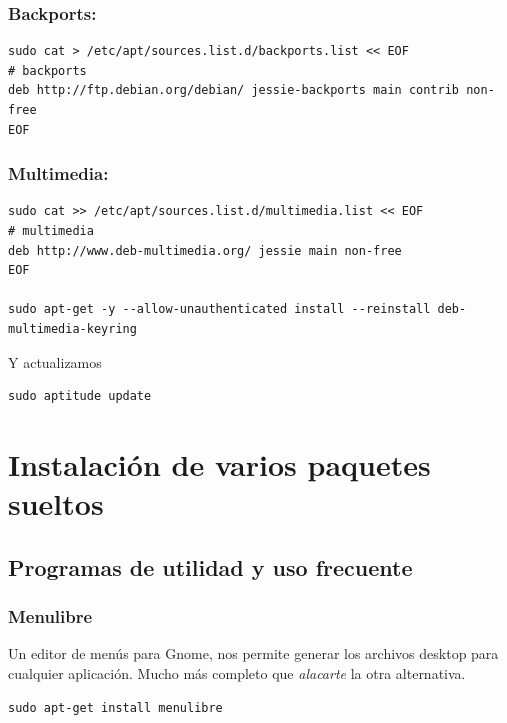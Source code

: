 \documentclass[12pt,spanish,]{scrartcl}
\begin{document}
\subsubsection{Backports:}\label{backports}

\begin{verbatim}
sudo cat > /etc/apt/sources.list.d/backports.list << EOF
# backports
deb http://ftp.debian.org/debian/ jessie-backports main contrib non-free
EOF
\end{verbatim}

\subsubsection{Multimedia:}\label{multimedia}

\begin{verbatim}
sudo cat >> /etc/apt/sources.list.d/multimedia.list << EOF
# multimedia
deb http://www.deb-multimedia.org/ jessie main non-free
EOF

sudo apt-get -y --allow-unauthenticated install --reinstall deb-multimedia-keyring
\end{verbatim}

Y actualizamos

\begin{verbatim}
sudo aptitude update
\end{verbatim}

\section{Instalación de varios paquetes
sueltos}\label{instalaciuxf3n-de-varios-paquetes-sueltos}

\subsection{Programas de utilidad y uso
frecuente}\label{programas-de-utilidad-y-uso-frecuente}

\subsubsection{Menulibre}\label{menulibre}

Un editor de menús para Gnome, nos permite generar los archivos desktop
para cualquier aplicación. Mucho más completo que \emph{alacarte} la
otra alternativa.

\begin{verbatim}
sudo apt-get install menulibre
\end{verbatim}
\end{document}
